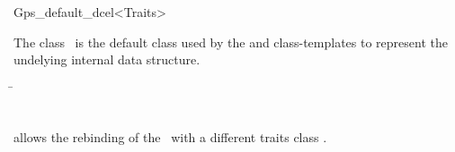 \ccRefPageBegin

\begin{ccRefClass}{Gps_default_dcel<Traits>}

\ccDefinition
The class \ccRefName\ is the default \dcel{} class used by the
 and  class-templates
to represent the undelying internal  data structure.


\ccIsModel

\ccInheritsFrom
  \begin{tabbing}
    \= \\
                        \>\\
                        \>
  \end{tabbing}

\ccTypes

   {allows the rebinding of the \dcel\ with a different traits class .}


\end{ccRefClass}

\ccRefPageEnd

